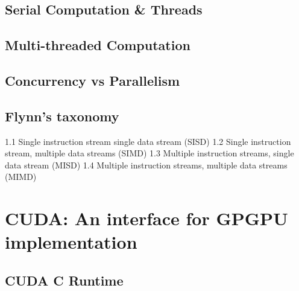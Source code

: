 \subsection{Serial Computation \& Threads}

%
%
%
\subsection{Multi-threaded Computation}

%
%
%
\subsection{Concurrency vs Parallelism}
\label{ch2sACssCVP}

%
%
%
\subsection{Flynn's taxonomy}
1.1	Single instruction stream single data stream (SISD)
1.2	Single instruction stream, multiple data streams (SIMD)
1.3	Multiple instruction streams, single data stream (MISD)
1.4	Multiple instruction streams, multiple data streams (MIMD)

%
%
%
\section{CUDA: An interface for GPGPU implementation}
\subsection{CUDA C Runtime}%
